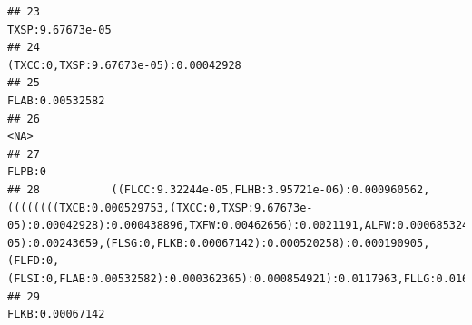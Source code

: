 \documentclass[]{article}
\begin{document}
\begin{verbatim}
## 23                                                                                                                                                                                                                                                                                                                                                                                                TXSP:9.67673e-05
## 24                                                                                                                                                                                                                                                                                                                                                                            (TXCC:0,TXSP:9.67673e-05):0.00042928
## 25                                                                                                                                                                                                                                                                                                                                                                                                 FLAB:0.00532582
## 26                                                                                                                                                                                                                                                                                                                                                                                                            <NA>
## 27                                                                                                                                                                                                                                                                                                                                                                                                          FLPB:0
## 28           ((FLCC:9.32244e-05,FLHB:3.95721e-06):0.000960562,((((((((TXCB:0.000529753,(TXCC:0,TXSP:9.67673e-05):0.00042928):0.000438896,TXFW:0.00462656):0.0021191,ALFW:0.000685324):0.000140543,LAFW:0.000833551):0.000556541,ALST:7.75698e-05):0.00243659,(FLSG:0,FLKB:0.00067142):0.000520258):0.000190905,(FLFD:0,(FLSI:0,FLAB:0.00532582):0.000362365):0.000854921):0.0117963,FLLG:0.0165317):0.000460481):0
## 29                                                                                                                                                                                                                                                                                                                                                                                                 FLKB:0.00067142

\end{verbatim}
\end{document}
